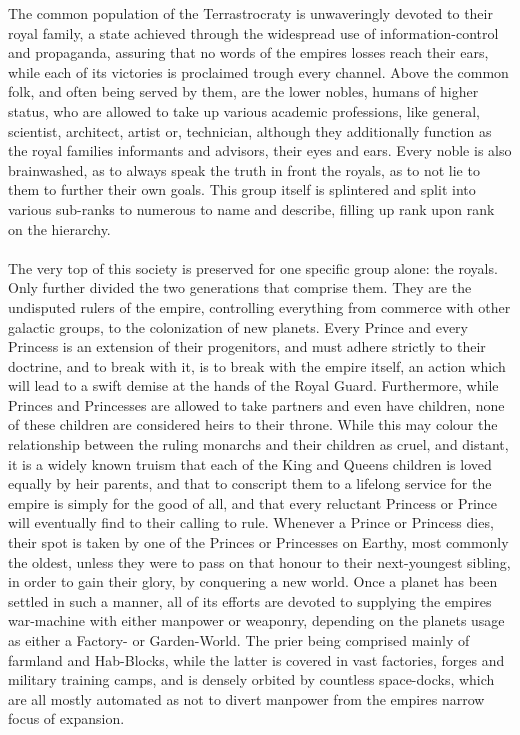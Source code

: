 \documentclass[a4paper,12pt]{book}
\begin{document}
The common population of the Terrastrocraty is unwaveringly devoted to their royal family, a state achieved through the widespread use of information-control and propaganda, assuring that no words of the empires losses reach their ears, while each of its victories is proclaimed trough every channel. Above the common folk, and often being served by them, are the lower nobles, humans of higher status, who are allowed to take up various academic professions, like general, scientist, architect, artist or, technician, although they additionally function as the royal families informants and advisors, their eyes and ears. Every noble is also brainwashed, as to always speak the truth in front the royals, as to not lie to them to further their own goals. This group itself is splintered and split into various sub-ranks to numerous to name and describe, filling up rank upon rank on the hierarchy.\\
\\
The very top of this society is preserved for one specific group alone: the royals. Only further divided the two generations that comprise them. They are the undisputed rulers of the empire, controlling everything from commerce with other galactic groups, to the colonization  of new planets. Every Prince and every Princess is an extension of their progenitors, and must adhere strictly to their doctrine, and to break with it, is to break with the empire itself, an action which will lead to a swift demise at the hands of the Royal Guard. Furthermore, while Princes and Princesses are allowed to take partners and even have children, none of these children are considered heirs to their throne. While this may colour the relationship between the ruling monarchs and their children as cruel, and distant, it is a widely known truism that each of the King and Queens children is loved equally by heir parents, and that to conscript them to a lifelong service for the empire is simply for the good of all, and that every reluctant Princess or Prince will eventually find to their calling to rule. Whenever a Prince or Princess dies, their spot is taken by one of the Princes or Princesses on Earthy, most commonly the oldest, unless they were to pass on that honour to their next-youngest sibling, in order to gain their glory, by conquering a new world. Once a planet has been settled in such a manner, all of its efforts are devoted to supplying the empires war-machine with either manpower or weaponry, depending on the planets usage as either a Factory- or Garden-World. The prier being comprised mainly of farmland and Hab-Blocks, while the latter is covered in vast factories, forges and military training camps, and is densely orbited by countless space-docks, which are all mostly automated as not to divert manpower from the empires narrow focus of expansion.\\
\end{document}
